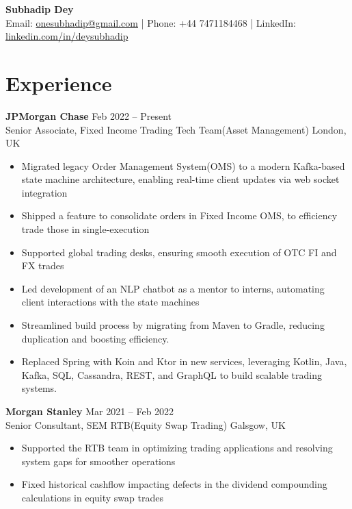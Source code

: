 \documentclass[a4paper,9pt]{article}  %
\begin{document}
\noindent
\textbf{\Large Subhadip Dey} \\
Email: \href{mailto:onesubhadip@gmail.com}{onesubhadip@gmail.com} | Phone: +44 7471184468 | LinkedIn: \href{https://www.linkedin.com/in/deysubhadip/}{linkedin.com/in/deysubhadip}



\section*{Experience}

\textbf{JPMorgan Chase} \hfill Feb 2022 -- Present \\
Senior Associate, Fixed Income Trading Tech Team(Asset Management) \hfill London, UK \vspace{-5pt}\\

\begin{itemize}[left=0pt, label=\textbullet, itemsep=0pt, parsep=0pt, topsep=0pt, partopsep=0pt]
    \item Migrated legacy Order Management System(OMS) to a modern Kafka-based state machine architecture, enabling real-time client updates via web socket integration
    \item Shipped a feature to consolidate orders in Fixed Income OMS, to efficiency trade those in single-execution
    \item Supported global trading desks, ensuring smooth execution of OTC FI and FX trades
    \item Led development of an NLP chatbot as a mentor to interns, automating client interactions with the state machines
    \item Streamlined build process by migrating from Maven to Gradle, reducing duplication and boosting efficiency.
    \item Replaced Spring with Koin and Ktor in new services, leveraging Kotlin, Java, Kafka, SQL, Cassandra, REST, and GraphQL to build scalable trading systems.
\end{itemize}
\vspace{8pt}

\textbf{Morgan Stanley} \hfill Mar 2021 -- Feb 2022 \\
Senior Consultant, SEM RTB(Equity Swap Trading) \hfill Galsgow, UK \vspace{-5pt}\\
\begin{itemize}[left=0pt, label=\textbullet, itemsep=0pt, parsep=0pt, topsep=0pt, partopsep=0pt]
    \item Supported the RTB team in optimizing trading applications and resolving system gaps for smoother operations
    \item Fixed historical cashflow impacting defects in the dividend compounding calculations in equity swap trades
\end{itemize}
\vspace{8pt}
\end{document}
